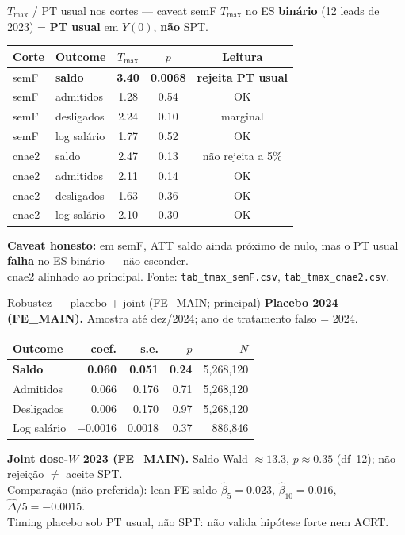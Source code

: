 \documentclass[aspectratio=169,11pt]{beamer}
\begin{document}
\begin{frame}{\(T_{\max}\) / PT usual nos cortes --- caveat semF}
\small
\(T_{\max}\) no ES \textbf{binário} (12 leads de 2023) = \textbf{PT usual} em \(Y(0)\), \textbf{não} SPT.
\begin{center}
\scriptsize
\begin{tabular}{llccc}
\toprule
Corte & Outcome & \(T_{\max}\) & \(p\) & Leitura \\
\midrule
semF & \textbf{saldo} & \textbf{3.40} & \textbf{0.0068} & \textbf{rejeita PT usual} \\
semF & admitidos & 1.28 & 0.54 & OK \\
semF & desligados & 2.24 & 0.10 & marginal \\
semF & log salário & 1.77 & 0.52 & OK \\
\midrule
cnae2 & saldo & 2.47 & 0.13 & não rejeita a 5\% \\
cnae2 & admitidos & 2.11 & 0.14 & OK \\
cnae2 & desligados & 1.63 & 0.36 & OK \\
cnae2 & log salário & 2.10 & 0.30 & OK \\
\bottomrule
\end{tabular}
\end{center}
\vspace{0.3em}
\textbf{Caveat honesto:} em semF, ATT saldo ainda próximo de nulo, mas o PT usual \textbf{falha} no ES binário --- não esconder.\\
cnae2 alinhado ao principal. Fonte: \texttt{tab\_tmax\_semF.csv}, \texttt{tab\_tmax\_cnae2.csv}.
\end{frame}

\begin{frame}{Robustez --- placebo + joint (FE\_MAIN; principal)}
\small
\textbf{Placebo 2024 (FE\_MAIN).} Amostra até dez/2024; ano de tratamento falso = 2024.
\begin{center}
\begin{tabular}{lrrrr}
\toprule
Outcome & coef. & s.e. & \(p\) & \(N\) \\
\midrule
\textbf{Saldo} & \textbf{0.060} & \textbf{0.051} & \textbf{0.24} & 5{,}268{,}120 \\
Admitidos & 0.066 & 0.176 & 0.71 & 5{,}268{,}120 \\
Desligados & 0.006 & 0.170 & 0.97 & 5{,}268{,}120 \\
Log salário & $-$0.0016 & 0.0018 & 0.37 & 886{,}846 \\
\bottomrule
\end{tabular}
\end{center}
\vspace{0.2em}
\textbf{Joint dose-\(W\) 2023 (FE\_MAIN).} Saldo Wald \(\approx 13.3\), \(p\approx 0.35\) (df~12); não-rejeição \(\neq\) aceite SPT.\\[0.3em]
{\footnotesize Comparação (não preferida): lean FE saldo \(\hat\beta_5=0.023\), \(\hat\beta_{10}=0.016\), \(\widehat{\Delta}/5=-0.0015\).\\
Timing placebo sob PT usual, não SPT: não valida hipótese forte nem ACRT.}
\end{frame}
\end{document}
